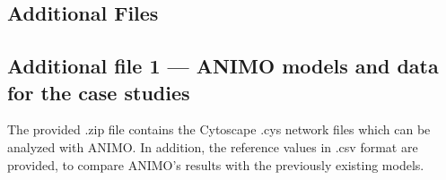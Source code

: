 \documentclass{bmcart}
\begin{document}
\begin{backmatter}






\clearpage

\section*{Additional Files}
  \subsection*{Additional file 1 --- ANIMO models and data for the case studies}
      The provided .zip file contains the Cytoscape .cys network files which can be analyzed
      with ANIMO. In addition, the reference values in .csv format are provided, to compare
      ANIMO's results with the previously existing models.


\end{backmatter}



\appendix
\clearpage
\setcounter{figure}{0}
\setcounter{table}{0}
\setcounter{page}{1}
\onecolumn



%
\end{document}
